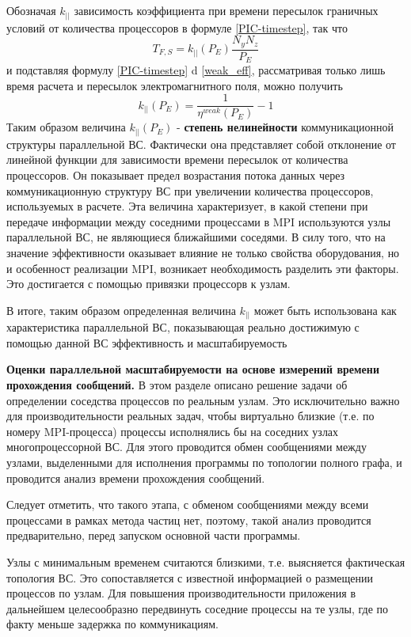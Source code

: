 Обозначая $k_{||}$ зависимость коэффициента при времени пересылок граничных условий от количества процессоров в формуле \ref{PIC-timestep}, так что 
\begin{equation}
T_{F,S} = k_{||} (P_E) \frac{N_y N_z}{P_E}
\end{equation} 
и подставляя формулу \ref{PIC-timestep} d \ref{weak_eff}, рассматривая только лишь время расчета и пересылок электромагнитного поля, можно получить 
\begin{equation}
k_{||} (P_E) = \frac{1}{\eta^{weak}(P_E)} - 1
\end{equation}	  
Таким образом величина $k_{||} (P_E)$  - \textbf{степень нелинейности} коммуникационной структуры параллельной ВС. Фактически она представляет собой отклонение от линейной функции для зависимости времени пересылок от количества процессоров. Он показывает предел возрастания потока данных через коммуникационную структуру ВС при увеличении количества процессоров, используемых в расчете. Эта величина характеризует, в какой степени при передаче информации между соседними процессами в MPI используются узлы параллельной ВС, не являющиеся ближайшими соседями. В силу того, что на значение эффективности оказывает влияние не только свойства оборудования, но и особенност реализации MPI, возникает необходимость разделить эти факторы. Это достигается с помощью привязки процессорв к узлам. 

В итоге, таким образом определенная  величина $k_{||} $ может быть использована как характеристика параллельной ВС, показывающая реально достижимую с помощью данной ВС эффективность и масштабируемость   

\textbf{Оценки параллельной масштабируемости на основе измерений времени прохождения сообщений.}
В этом разделе описано решение задачи об определении соседства процессов по реальным узлам. Это исключительно важно для производительности реальных задач, чтобы виртуально близкие (т.е. по номеру MPI-процесса) процессы исполнялись бы на соседних узлах многопроцессорной ВС. Для этого проводится обмен сообщениями между узлами, выделенными 
для исполнения программы по топологии полного графа, и проводится анализ времени прохождения сообщений.  

Следует отметить, что такого этапа, с обменом сообщениями между всеми процессами в рамках метода частиц нет, поэтому, такой анализ проводится предварительно, перед запуском основной части программы.



Узлы с минимальным временем считаются близкими, т.е. выясняется фактическая топология ВС. Это сопоставляется с известной информацией о размещении процессов по узлам.	Для повышения производительности приложения в дальнейшем целесообразно передвинуть соседние процессы на те узлы, где по факту меньше задержка по коммуникациям.

